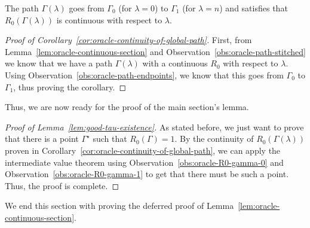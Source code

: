 \begin{corollary}\label{cor:oracle-continuity-of-global-path}
    The path $\Gamma(\lambda)$ goes from $\Gamma_0$ (for $\lambda=0$) to $\Gamma_1$ (for $\lambda=n$) and satisfies that $R_0(\Gamma(\lambda))$ is continuous with respect to $\lambda$. 
\end{corollary}
\begin{proof}[Proof of Corollary~\ref{cor:oracle-continuity-of-global-path}]
    First, from Lemma~\ref{lem:oracle-continuous-section} and Observation~\ref{obs:oracle-path-stitched} we know that we have a path $\Gamma(\lambda)$ with a continuous $R_0$ with respect to $\lambda$. Using Observation~\ref{obs:oracle-path-endpoints}, we know that this goes from $\Gamma_0$ to $\Gamma_1$, thus proving the corollary.
\end{proof}

Thus, we are now ready for the proof of the main section's lemma.

\begin{proof}[Proof of Lemma~\ref{lem:good-tau-existence}]
    As stated before, we just want to prove that there is a point $\Gamma^\star$ such that $R_0(\Gamma)=1$. By the continuity of $R_0(\Gamma(\lambda))$ proven in Corollary~\ref{cor:oracle-continuity-of-global-path}, we can apply the intermediate value theorem using Observation~\ref{obs:oracle-R0-gamma-0} and Observation~\ref{obs:oracle-R0-gamma-1} to get that there must be such a point. Thus, the proof is complete.
\end{proof}

\vspace{0.25in}

We end this section with proving the deferred proof of Lemma~\ref{lem:oracle-continuous-section}.

